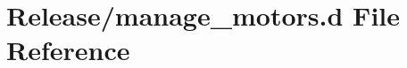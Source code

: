 \hypertarget{manage__motors_8d}{}\section{Release/manage\+\_\+motors.d File Reference}
\label{manage__motors_8d}
